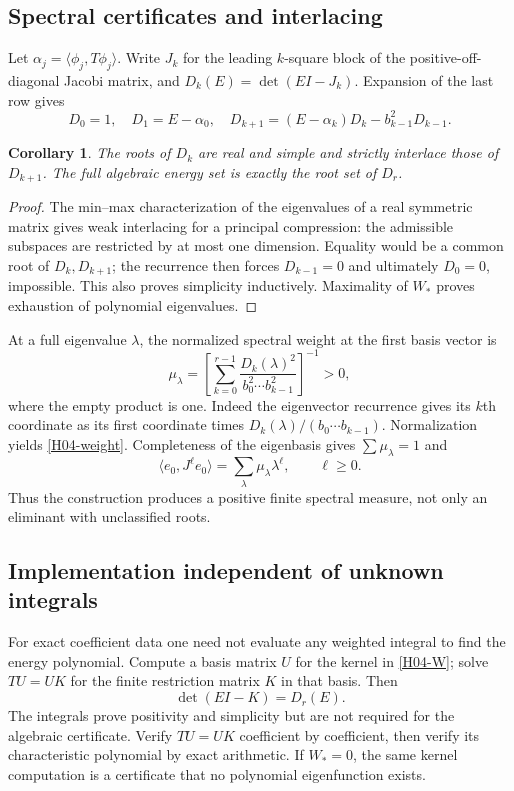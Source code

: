 \documentclass[11pt,a4paper]{article}
\newtheorem{corollary}[theorem]{Corollary}
\theoremstyle{definition}\newtheorem{definition}[theorem]{Definition}
\theoremstyle{remark}\newtheorem{remark}[theorem]{Remark}
\numberwithin{equation}{section}
\begin{document}
\subsection{Spectral certificates and interlacing}\label{H04-sec-4}
Let $\alpha_j=\langle\phi_j,T\phi_j\rangle$. Write $J_k$ for the leading $k$-square block of the positive-off-diagonal Jacobi matrix, and $D_k(E)=\det(EI-J_k)$. Expansion of the last row gives
\[D_0=1,\quad D_1=E-\alpha_0,\quad
D_{k+1}=(E-\alpha_k)D_k-b_{k-1}^2D_{k-1}.\]
\begin{corollary}
The roots of $D_k$ are real and simple and strictly interlace those of $D_{k+1}$. The full algebraic energy set is exactly the root set of $D_r$.
\end{corollary}
\begin{proof}
The min--max characterization of the eigenvalues of a real symmetric matrix gives weak interlacing for a principal compression: the admissible subspaces are restricted by at most one dimension. Equality would be a common root of $D_k,D_{k+1}$; the recurrence then forces $D_{k-1}=0$ and ultimately $D_0=0$, impossible. This also proves simplicity inductively. Maximality of $W_*$ proves exhaustion of polynomial eigenvalues.
\end{proof}
At a full eigenvalue $\lambda$, the normalized spectral weight at the first basis vector is
\begin{equation}\label{H04-weight}
\mu_\lambda=\left[\sum_{k=0}^{r-1}
\frac{D_k(\lambda)^2}{b_0^2\cdots b_{k-1}^2}\right]^{-1}>0,
\end{equation}
where the empty product is one. Indeed the eigenvector recurrence gives its $k$th coordinate as its first coordinate times $D_k(\lambda)/(b_0\cdots b_{k-1})$. Normalization yields \eqref{H04-weight}. Completeness of the eigenbasis gives $\sum\mu_\lambda=1$ and
\[\langle e_0,J^\ell e_0\rangle=\sum_\lambda\mu_\lambda\lambda^\ell,\qquad\ell\ge0.\]
Thus the construction produces a positive finite spectral measure, not only an eliminant with unclassified roots.
\subsection{Implementation independent of unknown integrals}\label{H04-sec-5}
For exact coefficient data one need not evaluate any weighted integral to find the energy polynomial. Compute a basis matrix $U$ for the kernel in \eqref{H04-W}; solve $TU=UK$ for the finite restriction matrix $K$ in that basis. Then
\[\det(EI-K)=D_r(E).\]
The integrals prove positivity and simplicity but are not required for the algebraic certificate. Verify $TU=UK$ coefficient by coefficient, then verify its characteristic polynomial by exact arithmetic. If $W_*=0$, the same kernel computation is a certificate that no polynomial eigenfunction exists.
\end{document}
